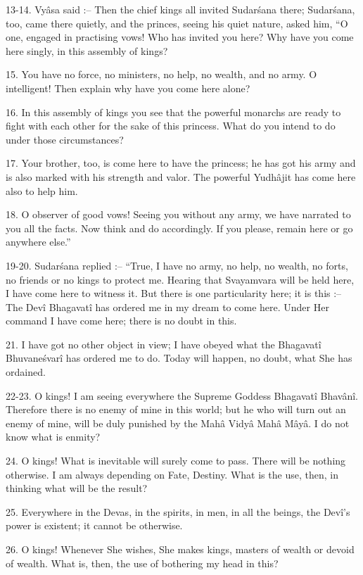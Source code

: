13-14. Vy\^asa said :-- Then the chief kings all invited Sudar\'sana there; Sudar\'sana, too, came there quietly, and the princes, seeing his quiet nature, asked him, ``O one, engaged in practising vows! Who has invited you here? Why have you come here singly, in this assembly of kings?

15. You have no force, no ministers, no help, no wealth, and no army. O intelligent! Then explain why have you come here alone?

16. In this assembly of kings you see that the powerful monarchs are ready to fight with each other for the sake of this princess. What do you intend to do under those circumstances?

17. Your brother, too, is come here to have the princess; he has got his army and is also marked with his strength and valor. The powerful Yudh\^ajit has come here also to help him.

18. O observer of good vows! Seeing you without any army, we have narrated to you all the facts. Now think and do accordingly. If you please, remain here or go anywhere else.''

19-20. Sudar\'sana replied :-- ``True, I have no army, no help, no wealth, no forts, no friends or no kings to protect me. Hearing that Svayamvara will be held here, I have come here to witness it. But there is one particularity here; it is this :-- The Dev\^i Bhagavat\^i has ordered me in my dream to come here. Under Her command I have come here; there is no doubt in this.

21. I have got no other object in view; I have obeyed what the Bhagavat\^i Bhuvane\'svar\^i has ordered me to do. Today will happen, no doubt, what She has ordained.

22-23. O kings! I am seeing everywhere the Supreme Goddess Bhagavat\^i Bhav\^an\^i. Therefore there is no enemy of mine in this world; but he who will turn out an enemy of mine, will be duly punished by the Mah\^a Vidy\^a Mah\^a M\^ay\^a. I do not know what is enmity?

24. O kings! What is inevitable will surely come to pass. There will be nothing otherwise. I am always depending on Fate, Destiny. What is the use, then, in thinking what will be the result?

25. Everywhere in the Devas, in the spirits, in men, in all the beings, the Dev\^i's power is existent; it cannot be otherwise.

26. O kings! Whenever She wishes, She makes kings, masters of wealth or devoid of wealth. What is, then, the use of bothering my head in this?

